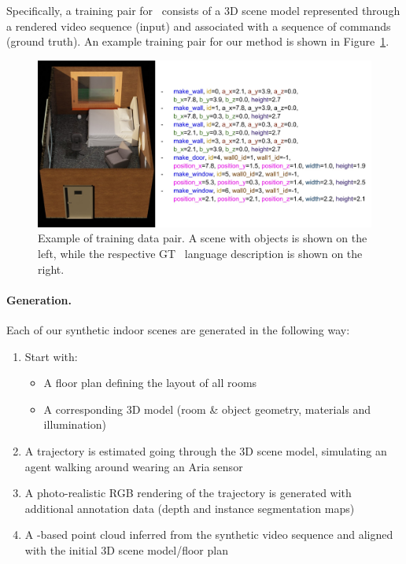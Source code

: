 Specifically, a training pair for \METHOD~consists of
a 3D scene model represented through a rendered video sequence
(input)
and associated with a sequence of commands (ground truth).
An example training pair for our method is shown in Figure~\ref{fig:training_datum}.
\begin{figure}
\includegraphics[width=1.0\columnwidth]{figs/sample_training_datum3.jpg}
\caption{Example of training data pair. A scene with objects is shown on the left, while the respective GT \METHOD~language description is shown on the right.}
\label{fig:training_datum}
\end{figure}

\paragraph{Generation.} Each of our synthetic indoor scenes are generated in the following way:
\begin{enumerate}
    \item Start with:
        \begin{itemize}
            \item A floor plan defining the layout of all rooms
            \item A corresponding 3D model (room \& object geometry, materials and illumination)
        \end{itemize}
    \item A trajectory is estimated going through the 3D scene model, simulating an agent walking around wearing an Aria sensor
    \item A photo-realistic RGB rendering of the trajectory is generated with additional annotation data (depth and instance segmentation maps)
    \item A \SLAM-based point cloud inferred from the synthetic video sequence and aligned with the initial 3D scene model/floor plan
\end{enumerate}



